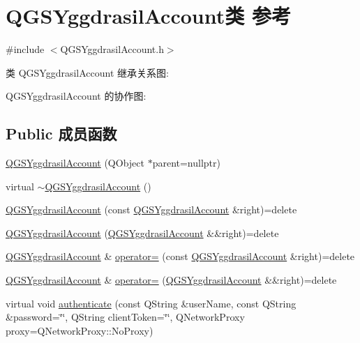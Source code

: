 \hypertarget{class_q_g_s_yggdrasil_account}{}\section{Q\+G\+S\+Yggdrasil\+Account类 参考}
\label{class_q_g_s_yggdrasil_account}


{\ttfamily \#include $<$Q\+G\+S\+Yggdrasil\+Account.\+h$>$}



类 Q\+G\+S\+Yggdrasil\+Account 继承关系图\+:


Q\+G\+S\+Yggdrasil\+Account 的协作图\+:
\subsection*{Public 成员函数}
\begin{DoxyCompactItemize}
\item 
\mbox{\hyperlink{class_q_g_s_yggdrasil_account_a6588f9f43eb95a86033b0559bb841aad}{Q\+G\+S\+Yggdrasil\+Account}} (Q\+Object $\ast$parent=nullptr)
\item 
virtual \mbox{\hyperlink{class_q_g_s_yggdrasil_account_a2f48ba9720ae4e234db52cbf4c1bf1b2}{$\sim$\+Q\+G\+S\+Yggdrasil\+Account}} ()
\item 
\mbox{\hyperlink{class_q_g_s_yggdrasil_account_ab594c8f22974d0e7df2e76c603ed52cf}{Q\+G\+S\+Yggdrasil\+Account}} (const \mbox{\hyperlink{class_q_g_s_yggdrasil_account}{Q\+G\+S\+Yggdrasil\+Account}} \&right)=delete
\item 
\mbox{\hyperlink{class_q_g_s_yggdrasil_account_aac5dc08942f3e5527c03365ff610df9d}{Q\+G\+S\+Yggdrasil\+Account}} (\mbox{\hyperlink{class_q_g_s_yggdrasil_account}{Q\+G\+S\+Yggdrasil\+Account}} \&\&right)=delete
\item 
\mbox{\hyperlink{class_q_g_s_yggdrasil_account}{Q\+G\+S\+Yggdrasil\+Account}} \& \mbox{\hyperlink{class_q_g_s_yggdrasil_account_a9e8f8a5eee8beae12b5dc4e6d51e1765}{operator=}} (const \mbox{\hyperlink{class_q_g_s_yggdrasil_account}{Q\+G\+S\+Yggdrasil\+Account}} \&right)=delete
\item 
\mbox{\hyperlink{class_q_g_s_yggdrasil_account}{Q\+G\+S\+Yggdrasil\+Account}} \& \mbox{\hyperlink{class_q_g_s_yggdrasil_account_ace4e9bb9a6aa3015f7a5b4f7603a91e4}{operator=}} (\mbox{\hyperlink{class_q_g_s_yggdrasil_account}{Q\+G\+S\+Yggdrasil\+Account}} \&\&right)=delete
\item 
virtual void \mbox{\hyperlink{class_q_g_s_yggdrasil_account_a4f61bb0f718f6c4a35bb329e2bd6d09b}{authenticate}} (const Q\+String \&user\+Name, const Q\+String \&password=\char`\"{}\char`\"{}, Q\+String client\+Token=\char`\"{}\char`\"{}, Q\+Network\+Proxy proxy=Q\+Network\+Proxy\+::\+No\+Proxy)
\end{DoxyCompactItemize}
